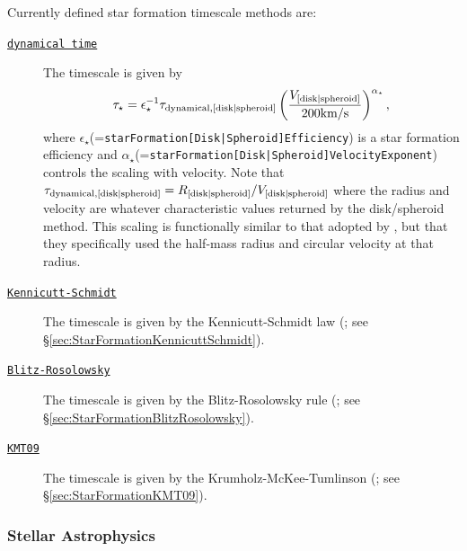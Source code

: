 Currently defined star formation timescale methods are:
\begin{description}
 \item [\hyperlink{star_formation.timescales.disks.dynamical_time.F90:star_formation_timescale_disks_dynamical_time:star_formation_timescale_disk_dynamical_time}{{\tt dynamical time}}]  The timescale is given by
\begin{equation}
 \tau_\star = \epsilon_\star^{-1} \tau_{\rm dynamical, [disk|spheroid]} \left( {V_{\rm [disk|spheroid]} \over 200\hbox{km/s}} \right)^{\alpha_\star},
\end{equation}
where $\epsilon_\star$(={\tt starFormation[Disk|Spheroid]Efficiency}) is a star formation efficiency and $\alpha_\star$(={\tt starFormation[Disk|Spheroid]VelocityExponent}) controls the scaling with velocity. Note that $\tau_{\rm dynamical,[disk|spheroid]}=R_{\rm [disk|spheroid]}/V_{\rm [disk|spheroid]}$ where the radius and velocity are whatever characteristic values returned by the disk/spheroid method. This scaling is functionally similar to that adopted by \cite{cole_hierarchical_2000}, but that they specifically used the half-mass radius and circular velocity at that radius.
 \item [\hyperlink{star_formation.timescales.disks.Kennicutt-Schmidt.F90:star_formation_timescale_disks_kennicutt_schmidt:star_formation_timescale_disk_kennicutt_schmidt}{{\tt Kennicutt-Schmidt}}] The timescale is given by the Kennicutt-Schmidt law (\citealt{schmidt_rate_1959,kennicutt_global_1998}; see \S\ref{sec:StarFormationKennicuttSchmidt}).
 \item [\hyperlink{star_formation.timescales.disks.Blitz-Rosolowsky.F90:star_formation_timescale_disks_blitz_rosolowsky:star_formation_timescale_disk_blitz_rosolowsky}{{\tt Blitz-Rosolowsky}}] The timescale is given by the Blitz-Rosolowsky rule (\citealt{blitz_role_2006}; see \S\ref{sec:StarFormationBlitzRosolowsky}).
 \item [\hyperlink{star_formation.timescales.disks.KMT09.F90:star_formation_timescale_disks_kmt09:star_formation_timescale_disk_kmt09}{{\tt KMT09}}] The timescale is given by the Krumholz-McKee-Tumlinson (\citealt{krumholz_star_2009}; see \S\ref{sec:StarFormationKMT09}).
\end{description}

\subsubsection{Stellar Astrophysics}

